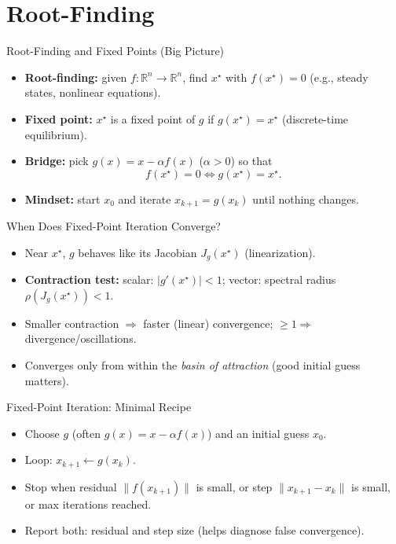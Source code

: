 
\section{Root-Finding}
 

\begin{frame}{Root-Finding and Fixed Points (Big Picture)}
\begin{itemize}\setlength\itemsep{0.6em}
  \item \textbf{Root-finding:} given $f:\mathbb{R}^n\!\to\!\mathbb{R}^n$, find $x^\star$ with $f(x^\star)=0$ (e.g., steady states, nonlinear equations).
  \item \textbf{Fixed point:} $x^\star$ is a fixed point of $g$ if $g(x^\star)=x^\star$ (discrete-time equilibrium).
  \item \textbf{Bridge:} pick $g(x)=x-\alpha f(x)$ ($\alpha>0$) so that
  \[
  f(x^\star)=0 \iff g(x^\star)=x^\star.
  \]
  \item \textbf{Mindset:} start $x_0$ and iterate $x_{k+1}=g(x_k)$ until nothing changes.
\end{itemize}
\end{frame}

\begin{frame}{When Does Fixed-Point Iteration Converge?}
\begin{itemize}\setlength\itemsep{0.6em}
  \item Near $x^\star$, $g$ behaves like its Jacobian $J_g(x^\star)$ (linearization).
  \item \textbf{Contraction test:} scalar: $|g'(x^\star)|<1$; vector: spectral radius $\rho(J_g(x^\star))<1$.
  \item Smaller contraction $\Rightarrow$ faster (linear) convergence; $\ge 1 \Rightarrow$ divergence/oscillations.
  \item Converges only from within the \emph{basin of attraction} (good initial guess matters).
\end{itemize}
\end{frame}

\begin{frame}{Fixed-Point Iteration: Minimal Recipe}
\begin{itemize}\setlength\itemsep{0.6em}
  \item Choose $g$ (often $g(x)=x-\alpha f(x)$) and an initial guess $x_0$.
  \item Loop: \quad $x_{k+1}\leftarrow g(x_k)$.
  \item Stop when residual $\|f(x_{k+1})\|$ is small, or step $\|x_{k+1}-x_k\|$ is small, or max iterations reached.
  \item Report both: residual and step size (helps diagnose false convergence).
\end{itemize}
\end{frame}

